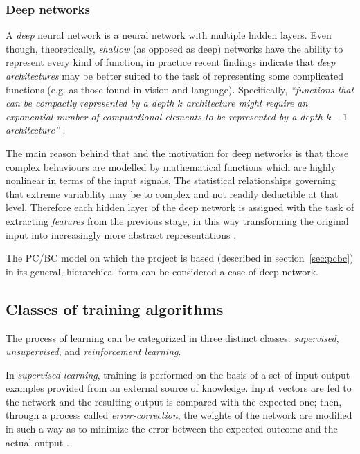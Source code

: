 \documentclass[11pt,a4paper]{report}
\newcommand{\quot}[1]{``#1''}
\begin{document}
				\subsubsection{Deep networks}
				A \emph{deep} neural network is a neural network with multiple hidden layers. Even though, theoretically, \emph{shallow} (as opposed as deep) networks have the ability to represent every kind of function, in practice recent findings indicate that \emph{deep architectures} may be better suited to the task of representing some complicated functions (e.g. as those found in vision and language). Specifically, \emph{\quot{functions that can be compactly represented by a depth $k$ architecture might require an exponential number of computational elements to be represented by a depth $k - 1$ architecture}} \cite{bengio2009learning}.
			
				The main reason behind that and the motivation for deep networks is that those complex behaviours are modelled by mathematical functions which are highly nonlinear in terms of the input signals. The statistical relationships governing that extreme variability may be to complex and not readily deductible at that level. Therefore each hidden layer of the deep network is assigned with the task of extracting \emph{features} from the previous stage, in this way transforming the original input into increasingly more abstract representations \cite{bengio2009learning}.
				
				The PC/BC model on which the project is based (described in section~\ref{sec:pcbc}) in its general, hierarchical form can be considered a case of deep network.
		
			\subsection{Classes of training algorithms}
				The process of learning can be categorized in three distinct classes: \emph{supervised}, \emph{unsupervised}, and \emph{reinforcement learning}.
				
				In \emph{supervised learning}, training is performed on the basis of a set of input-output examples provided from an external source of knowledge. Input vectors are fed to the network and the resulting output is compared with the expected one; then, through a process called \emph{error-correction}, the weights of the network are modified in such a way as to minimize the error between the expected outcome and the actual output \cite{haykin2009neural}.
				
\end{document}
